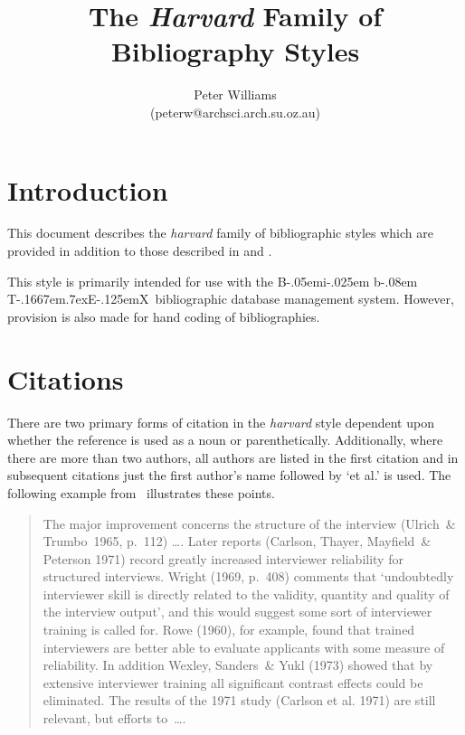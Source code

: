 \def\BibTeX{{\rm B\kern-.05em{\sc i\kern-.025em b}\kern-.08em
    T\kern-.1667em\lower.7ex\hbox{E}\kern-.125emX}}

\title{The {\em Harvard} Family of Bibliography Styles}
\author{Peter Williams \\ (peterw@archsci.arch.su.oz.au)}


\maketitle
\section{Introduction}
This document describes the {\em harvard} family of bibliographic styles which
are provided in addition to those described in  and 
\cite{latex,btxdoc}.

This style is primarily intended for use with the \BibTeX\ bibliographic
database management system.
However, provision is also made for hand coding of bibliographies.
\section{Citations}
There are two primary forms of citation in the {\em harvard} style dependent
upon whether the reference is used as a noun or parenthetically.
Additionally, where there are more than two authors, all authors are listed in
the first citation and in subsequent citations just the first author's name
followed by `et al.' is used.
The following example from \ illustrates these points.
\begin{quote}
The major improvement concerns the structure of the interview
(Ulrich~\& Trumbo~1965, p.~112) \ldots .
Later reports (Carlson, Thayer, Mayfield~\& Peterson 1971) record greatly 
increased interviewer reliability for structured interviews.
Wright (1969, p.~408) comments that `undoubtedly interviewer skill is
directly related to the validity, quantity and quality of the interview output',
and this would suggest some sort of interviewer training is called for.
Rowe (1960), for example, found that trained interviewers are better able to
evaluate applicants with some measure of reliability.
In addition Wexley, Sanders~\& Yukl (1973) showed that by extensive interviewer
training all significant contrast effects could be eliminated.
The results of the 1971 study (Carlson et al. 1971) are still relevant, but
efforts to~\ldots.
\end{quote}

